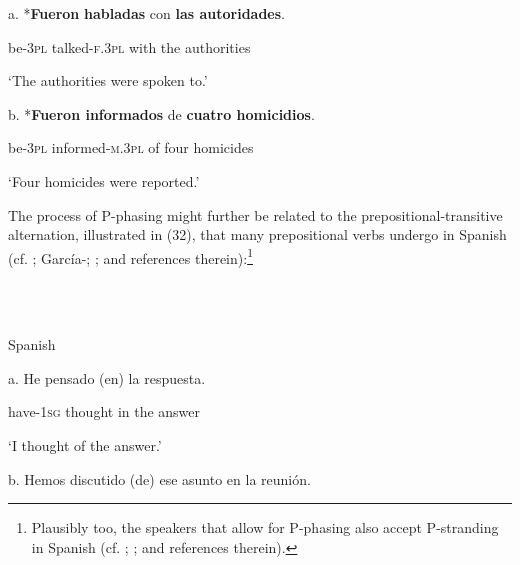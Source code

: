 \documentclass[output=paper]{langsci/langscibook}
\begin{document}
\begin{styleHTMLPreformatted}
  a.  *\textbf{Fueron}  \textbf{habladas}          con   \textbf{las  autoridades}.  
\end{styleHTMLPreformatted}

                  be{}-\textsc{3pl}   talked{}-\textsc{f.3pl} with  the  authorities

                       ‘The authorities were spoken to.’

b.   *\textbf{Fueron  informados}              de  \textbf{cuatro homicidios}.

                be{}-\textsc{3pl}   informed-\textsc{m.3pl} of    four     homicides

‘Four homicides were reported.’

\begin{styleHTMLPreformatted}
The process of P-phasing might further be related to the prepositional-transitive alternation, illustrated in (32), that many prepositional verbs undergo in Spanish (cf. \citealt{Demonte1991}; García-\citealt{Miguel1995}; \citealt{Gallego2010}; and references therein):\footnote{Plausibly too, the speakers that allow for P-phasing also accept P-stranding in Spanish (cf. \citet{Depiante2013}; \citealt{Lemos2013}; and references therein).}
\end{styleHTMLPreformatted}

\begin{styleHTMLPreformatted}
\ea%
    \label{ex:key:32}
    \gll\\
        \\
    \glt
    \z

          Spanish
\end{styleHTMLPreformatted}

\begin{styleHTMLPreformatted}
a.   He             pensado (en) la     respuesta.        
\end{styleHTMLPreformatted}

\begin{styleHTMLPreformatted}
        have{}-\textsc{1sg}  thought    in   the   answer
\end{styleHTMLPreformatted}

\begin{styleHTMLPreformatted}
        ‘I thought of the answer.’
\end{styleHTMLPreformatted}

\begin{styleHTMLPreformatted}
  b.   Hemos      discutido  (de)     ese  asunto  en  la   reunión.  
\end{styleHTMLPreformatted}
\end{document}

